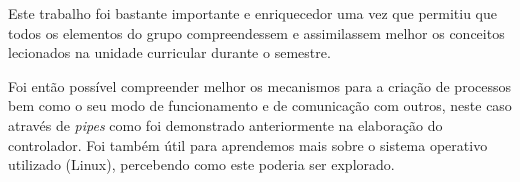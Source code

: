 \documentclass{report}
\begin{document}
Este trabalho foi bastante importante e enriquecedor uma vez que permitiu que todos os elementos do grupo compreendessem e assimilassem melhor os conceitos lecionados na unidade curricular durante o semestre. 

Foi então possível compreender melhor os mecanismos para a criação de processos bem como o seu modo de funcionamento e de comunicação com outros, neste caso através de \emph{pipes} como foi demonstrado anteriormente na elaboração do controlador.
Foi também útil para aprendemos mais sobre o sistema operativo utilizado (Linux), percebendo como este poderia ser explorado.
\end{document}

